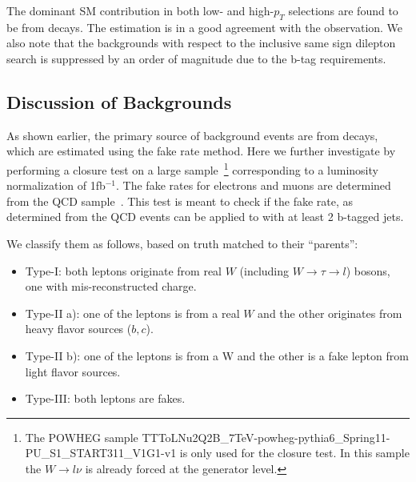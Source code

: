 The dominant SM contribution in both low- and high-$p_T$ selections are found to be from \ttbar decays. The estimation
is in a good agreement with the observation. We also note that the backgrounds with respect to the inclusive same sign
dilepton search is suppressed by an order of magnitude due to the b-tag requirements.

\subsection{Discussion of Backgrounds}
\label{bkgdiscussion}

As shown earlier, the primary source of background events are from \ttbar decays, which are estimated using the fake rate method. Here we further investigate 
by performing a closure test on a large \ttbar sample~\footnote{The POWHEG sample TTToLNu2Q2B\_7TeV-powheg-pythia6\_Spring11-PU\_S1\_START311\_V1G1-v1 is only used for the 
closure test. In this sample the $W \rightarrow l \nu$ is already forced at the generator level.} corresponding to a luminosity normalization of 1fb$^{-1}$. The fake 
rates for electrons and muons are determined from the QCD sample~\cite{ssnote2011}. This test is meant to check if the fake rate, as determined from the QCD events 
can be applied to \ttbar with at least 2 b-tagged jets. 

We classify them as follows, based on truth matched to their ``parents'':
\begin{itemize}
\item Type-I: both leptons originate from real $W$ (including $W \rightarrow \tau \rightarrow l$) bosons, one with 
mis-reconstructed charge.
\item Type-II a): one of the leptons is from a real $W$ and the other originates from heavy flavor sources ($b,c$).
\item Type-II b): one of the leptons is from a W and the other is a fake lepton from light flavor sources.
\item Type-III: both leptons are fakes.
\end{itemize} 

